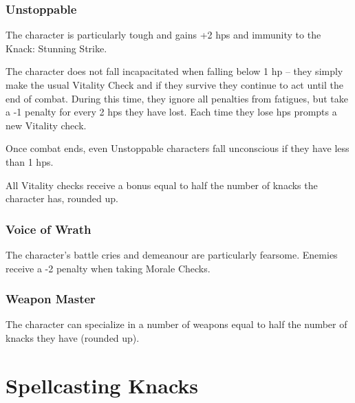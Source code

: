 \begin{multicols}{2}
\subsubsection{Unstoppable}

The character is particularly tough and gains +2 \glspl{hp} and immunity to the Knack: Stunning Strike.

The character does not fall incapacitated when falling below 1 \gls{hp} -- they simply make the usual Vitality Check and if they survive they continue to act until the end of combat.
 During this time, they ignore all penalties from \glspl{fatigue}, but take a -1 penalty for every 2 \glspl{hp} they have lost.
Each time they lose \glspl{hp} prompts a new Vitality check.

Once combat ends, even Unstoppable characters fall unconscious if they have less than 1 \glspl{hp}.

All Vitality checks receive a bonus equal to half the number of knacks the character has, rounded up.

\subsubsection{Voice of Wrath}

The character's battle cries and demeanour are particularly fearsome.
Enemies receive a -2 penalty when taking Morale Checks.

\subsubsection{Weapon Master}

\iftoggle{verbose}{
  The character has trained long and hard with a particular weapon, such as a longsword, spear, shortbow, or rocks.
  They gain +1 to your Combat or Projectiles Bonus when using that weapon.
  
}{
  The character gains +1 to the Combat or Projectiles score when using a specialized weapon.
}%
  The character can specialize in a number of weapons equal to half the number of knacks they have (rounded up).

\end{multicols}

\section{Spellcasting Knacks}

